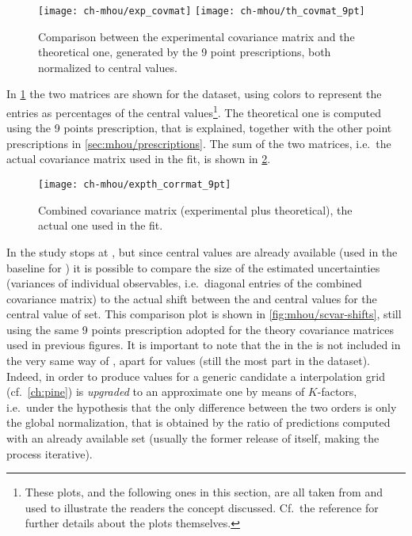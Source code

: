\begin{figure}
	\centering
	\texttt{[image: ch-mhou/exp\_covmat]}
	\texttt{[image: ch-mhou/th\_covmat\_9pt]}
	\caption{
		Comparison between the experimental covariance matrix and the
		theoretical one, generated by the 9 point prescriptions, both
		normalized to central values.
	}
	\label{fig:mhou/covmats}
\end{figure}

In \cref{fig:mhou/covmats} the two matrices are shown for the 
dataset, using colors to represent the entries as percentages of the central
values\footnote{
  These plots, and the following ones in this section, are all taken from
  \cite{NNPDF:2019ubu} and used to illustrate the readers the concept
  discussed.
  Cf.\ the reference for further details about the plots themselves.
}.
The theoretical one is computed using the 9 points prescription, that is
explained, together with the other point prescriptions in
\cref{sec:mhou/prescriptions}.
%
The sum of the two matrices, i.e.\ the actual covariance matrix used in the
 fit, is shown in \cref{fig:mhou/combined-covmat}.

\begin{figure}
	\centering
	\texttt{[image: ch-mhou/expth\_corrmat\_9pt]}
	\caption{
		Combined covariance matrix (experimental plus theoretical), the actual
		one used in the  fit.
	}
	\label{fig:mhou/combined-covmat}
\end{figure}

In \cite{NNPDF:2019ubu} the \mhou study stops at \nlo, but since \nnlo central
values are already available (used in the baseline for ) it is possible 
to compare the size of the estimated uncertainties (variances of individual
observables, i.e.\ diagonal entries of the combined covariance matrix) to the
actual shift between the \nlo and \nnlo central values for the central value of
 \pdf set.
%
This comparison plot is shown in \cref{fig:mhou/scvar-shifts}, still using the
same 9 points prescription adopted for the theory covariance matrices used in
previous figures.
%
It is important to note that the \nnlo in the \pdf is not included in the very
same way of \nlo, apart for \dis values (still the most part in the
 dataset).
Indeed, in order to produce \nnlo values for a generic \pdf candidate a \nlo
interpolation grid (cf.\ \cref{ch:pine}) is \textit{upgraded} to an approximate
\nnlo one by means of $K$-factors, i.e.\ under the hypothesis that the only
difference between the two orders is only the global normalization, that is
obtained by the ratio of predictions computed with an already available \pdf
set (usually the former release of \nnpdf itself, making the process
iterative).

